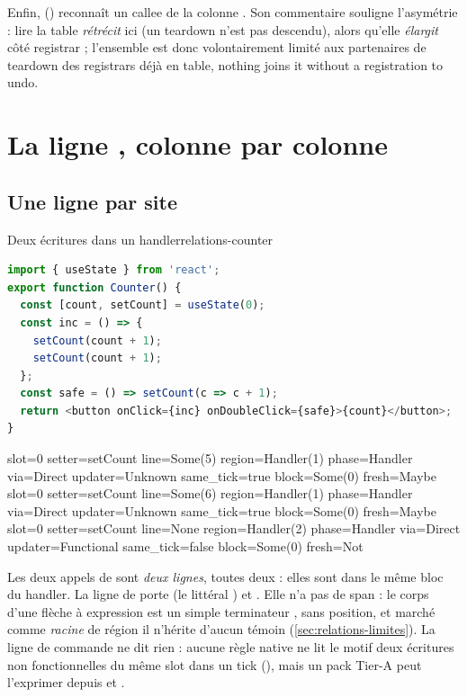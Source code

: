 Enfin,  () reconnaît un callee de la colonne . Son commentaire souligne l'asymétrie : lire la table \emph{rétrécit} ici (un teardown n'est pas descendu), alors qu'elle \emph{élargit} côté registrar ; l'ensemble est donc volontairement limité aux partenaires de teardown des registrars déjà en table, \og nothing joins it without a registration to undo\fg{}.

\section{La ligne , colonne par colonne}
\label{sec:relations-slotwriter}
\subsection{Une ligne par site}

\begin{exemple}{Deux écritures dans un handler}{relations-counter}
\begin{lstlisting}[language=TypeScript,caption={\file{/tmp/relprobe/ex1.tsx}},label={lst:relations-counter}]
import { useState } from 'react';
export function Counter() {
  const [count, setCount] = useState(0);
  const inc = () => {
    setCount(count + 1);
    setCount(count + 1);
  };
  const safe = () => setCount(c => c + 1);
  return <button onClick={inc} onDoubleClick={safe}>{count}</button>;
}
\end{lstlisting}
\begin{sortie}
  slot=0 setter=setCount line=Some(5) region=Handler(1) phase=Handler via=Direct updater=Unknown    same_tick=true  block=Some(0) fresh=Maybe
  slot=0 setter=setCount line=Some(6) region=Handler(1) phase=Handler via=Direct updater=Unknown    same_tick=true  block=Some(0) fresh=Maybe
  slot=0 setter=setCount line=None    region=Handler(2) phase=Handler via=Direct updater=Functional same_tick=false block=Some(0) fresh=Not
\end{sortie}
Les deux appels de  sont \emph{deux lignes}, toutes deux  : elles sont dans le même bloc du handler. La ligne de  porte  (le littéral ) et . Elle n'a pas de span : le corps d'une flèche à expression est un simple terminateur , sans position, et marché comme \emph{racine} de région il n'hérite d'aucun témoin (\cref{sec:relations-limites}). La ligne de commande ne dit rien : aucune règle native ne lit le motif \og deux écritures non fonctionnelles du même slot dans un tick\fg{} (), mais un pack Tier-A peut l'exprimer depuis  et .
\end{exemple}

